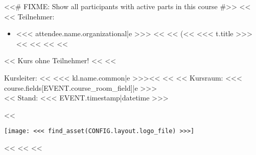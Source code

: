         <<# FIXME: Show all participants with active parts in this course #>>
        <<%
            <<%
                Teilnehmer:
                \begin{itemize}
                    <<%
                        \item <<< attendee.name.organizational|e >>>
                              <<%
                              <<%
                                (<<%
                                    <<< t.title >>><<%
                                 <<%
                              <<%
                    <<%
                \end{itemize}
            <<%
                Kurs ohne Teilnehmer!
            <<%
        <<%

        \vspace{\fill}
        \begin{minipage}[b]{\textwidth-2.5cm}%
            Kursleiter:
            <<%
                <<< kl.name.common|e >>><<%
            <<%
            <<%
                Kursraum: <<< course.fields[EVENT.course_room_field]|e >>>\\
            <<%
            Stand: <<< EVENT.timestamp|datetime >>>
        \end{minipage}%
        \hspace{0.5cm}%
        <<%
            \begin{minipage}[b][2cm][b]{2cm}%
                \texttt{[image: <<< find\_asset(CONFIG.layout.logo\_file) >>>]}
            \end{minipage}%
        <<%
        \pagebreak
    <<%
<<%
